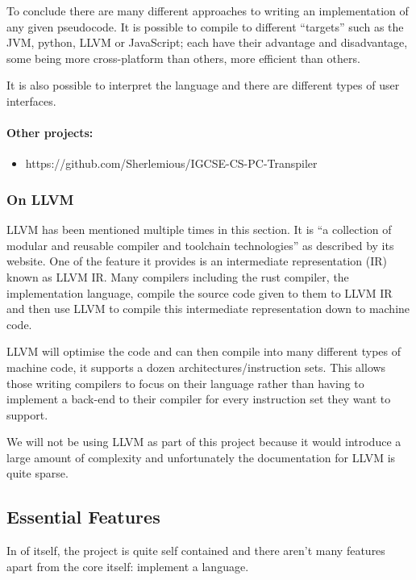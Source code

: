 \documentclass{article}
\begin{document}
To conclude there are many different approaches to writing an implementation of
any given pseudocode. It is possible to compile to different ``targets'' such
as the JVM, python, LLVM or JavaScript; each have their advantage and
disadvantage, some being more cross-platform than others, more efficient than
others.

It is also possible to interpret the language and there are different types of
user interfaces.

\paragraph{Other projects:}

\begin{itemize}
    \item{https://github.com/Sherlemious/IGCSE-CS-PC-Transpiler}
\end{itemize}

\subsubsection{On LLVM}

LLVM has been mentioned multiple times in this section. It is ``a collection of
modular and reusable compiler and toolchain technologies'' as described by its
website. One of the feature it provides is an intermediate representation (IR)
known as LLVM IR. Many compilers including the rust compiler, the
implementation language, compile the source code given to them to LLVM IR and
then use LLVM to compile this intermediate representation down to machine code.

LLVM will optimise the code and can then compile into many different types of
machine code, it supports a dozen architectures/instruction sets. This allows
those writing compilers to focus on their language rather than having to
implement a back-end to their compiler for every instruction set they want to
support.

We will not be using LLVM as part of this project because it would introduce a
large amount of complexity and unfortunately the documentation for LLVM is
quite sparse.

\subsection{Essential Features}


In of itself, the project is quite self contained and there aren't many
features apart from the core itself: implement a language.
\end{document}
